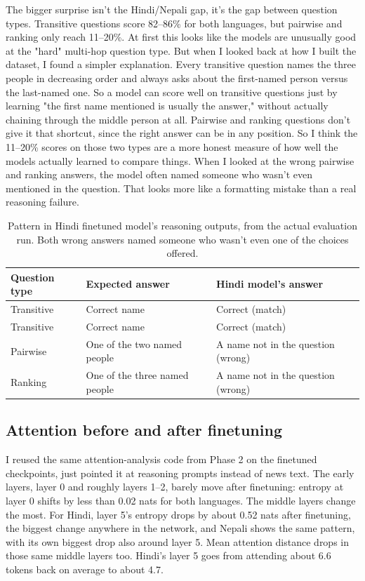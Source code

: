 \documentclass[10pt]{article}
\begin{document}
The bigger surprise isn't the Hindi/Nepali gap, it's the gap between question types. Transitive questions score 82--86\% for both languages, but pairwise and ranking only reach 11--20\%. At first this looks like the models are unusually good at the "hard" multi-hop question type. But when I looked back at how I built the dataset, I found a simpler explanation. Every transitive question names the three people in decreasing order and always asks about the first-named person versus the last-named one. So a model can score well on transitive questions just by learning "the first name mentioned is usually the answer," without actually chaining through the middle person at all. Pairwise and ranking questions don't give it that shortcut, since the right answer can be in any position. So I think the 11--20\% scores on those two types are a more honest measure of how well the models actually learned to compare things. When I looked at the wrong pairwise and ranking answers, the model often named someone who wasn't even mentioned in the question. That looks more like a formatting mistake than a real reasoning failure.

\begin{table}[h]
\centering
\small
\begin{tabular}{lll}
\toprule
Question type & Expected answer & Hindi model's answer \\
\midrule
Transitive & Correct name & Correct (match) \\
Transitive & Correct name & Correct (match) \\
Pairwise & One of the two named people & A name not in the question (wrong) \\
Ranking & One of the three named people & A name not in the question (wrong) \\
\bottomrule
\end{tabular}
\caption{Pattern in Hindi finetuned model's reasoning outputs, from the actual evaluation run. Both wrong answers named someone who wasn't even one of the choices offered.}
\end{table}

\subsection{Attention before and after finetuning}

I reused the same attention-analysis code from Phase 2 on the finetuned checkpoints, just pointed it at reasoning prompts instead of news text. The early layers, layer 0 and roughly layers 1--2, barely move after finetuning: entropy at layer 0 shifts by less than 0.02 nats for both languages. The middle layers change the most. For Hindi, layer 5's entropy drops by about 0.52 nats after finetuning, the biggest change anywhere in the network, and Nepali shows the same pattern, with its own biggest drop also around layer 5. Mean attention distance drops in those same middle layers too. Hindi's layer 5 goes from attending about 6.6 tokens back on average to about 4.7.
\end{document}
